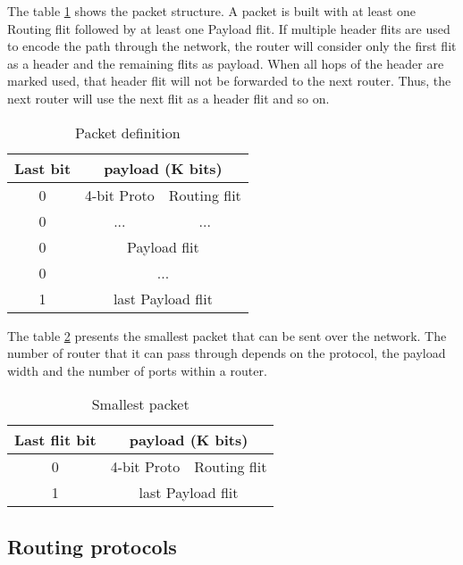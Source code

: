 The table \ref{packet_definition} shows the packet structure. A packet is built with at least one Routing flit followed
by at least one Payload flit. If multiple header flits are used to encode the path through the network, the router will
consider only the first flit as a header and the remaining flits as payload. When all hops of the header are marked
used, that header flit will not be forwarded to the next router. Thus, the next router will use the next flit as a
header flit and so on.

\begin{table}[h]
  \centering
  \begin{tabular}{c | c | c}
    \toprule\hline
    \textbf{Last bit} & \multicolumn{2}{c}{\textbf{payload (K bits)}} \\
    \hline\hline
    0 & 4-bit Proto & Routing flit \\
    \hline
    0 & ... & ... \\
    \hline
    0 & \multicolumn{2}{c}{Payload flit} \\
    \hline
    0 & \multicolumn{2}{c}{...} \\
    \hline
    1 & \multicolumn{2}{c}{last Payload flit} \\
    \hline\bottomrule
  \end{tabular}
  \caption{Packet definition}
  \label{packet_definition}
\end{table}


The table \ref{smallest_packet} presents the smallest packet that can be sent over the network. The number of router
that it can pass through depends on the protocol, the payload width and the number of ports within a router.

\begin{table}[h]
  \centering
  \begin{tabular}{c | c | c}
    \toprule\hline
    \textbf{Last flit bit} & \multicolumn{2}{c}{\textbf{payload (K bits)}} \\
    \hline\hline
    0 & 4-bit Proto & Routing flit \\
    \hline
    1 & \multicolumn{2}{c}{last Payload flit} \\
    \hline\bottomrule
  \end{tabular}
  \caption{Smallest packet}
  \label{smallest_packet}
\end{table}


\subsection{Routing protocols}

